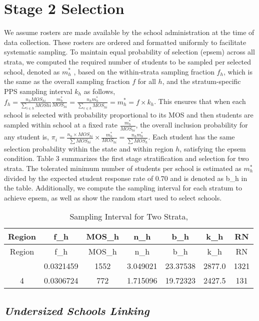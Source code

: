 \documentclass[
  12pt]{article}
\begin{document}
\section{Stage 2 Selection}\label{stage-2-selection}

We assume rosters are made available by the school administration at the
time of data collection. These rosters are ordered and formatted
uniformly to facilitate systematic sampling. To maintain equal
probability of selection (epsem) across all strata, we computed the
required number of students to be sampled per selected school, denoted
as \(m^*_h\) , based on the within-strata sampling fraction \(f_h\),
which is the same as the overall sampling fraction \(f\) for all \(h\),
and the stratum-specific PPS sampling interval \(k_h\) as follows,
\(f_h = \frac{n_h MOS_{hi} }{\sum_{i \in h} MOS{hi} } \frac{m^*_h}{MOS_{hi}} = \frac{n_h m^*_h}{\sum_{e \in h}MOS_{hi}} = m^*_h = f \times k_h\).
This ensures that when each school is selected with probability
proportional to its MOS and then students are sampled within school at a
fixed rate \(\frac{m^*_h}{MOS_{hi}}\), the overall inclusion probability
for any student is,
\(\pi_{i} = \frac{n_h \times MOS_{hi}}{\sum MOS_{hi}} \times \frac{m^*_h}{MOS_{hi}} = \frac{n_h m^*_h}{\sum MOS_h}\).
Each student has the same selection probability within the state and
within region \(h\), satisfying the epsem condition. Table 3 summarizes
the first stage stratification and selection for two strata. The
tolerated minimum number of students per school is estimated as
\(m^*_h\) divided by the expected student response rate of 0.70 and is
denoted as b\_h in the table. Additionally, we compute the sampling
interval for each stratum to achieve epsem, as well as show the random
start used to select schools.

\begin{longtable}[]{@{}ccccccc@{}}
\caption{Sampling Interval for Two Strata,}\tabularnewline
\toprule\noalign{}
Region & f\_h & MOS\_h & n\_h & b\_h & k\_h & RN \\
\midrule\noalign{}
\endfirsthead
\toprule\noalign{}
Region & f\_h & MOS\_h & n\_h & b\_h & k\_h & RN \\
\midrule\noalign{}
\endhead
\bottomrule\noalign{}
\endlastfoot
3 & 0.0321459 & 1552 & 3.049021 & 23.37538 & 2877.0 & 1321 \\
4 & 0.0306724 & 772 & 1.715096 & 19.72323 & 2427.5 & 131 \\
\end{longtable}

\subsection{\texorpdfstring{\emph{Undersized Schools
Linking}}{Undersized Schools Linking}}\label{undersized-schools-linking}
\end{document}
